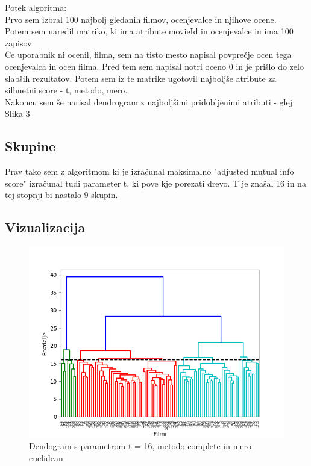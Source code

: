 \documentclass[a4paper,11pt]{article}
\begin{document}
		Potek algoritma:\\
		Prvo sem izbral 100 najbolj gledanih filmov, ocenjevalce in njihove ocene.\\
		Potem sem naredil matriko, ki ima atribute movieId in ocenjevalce in ima 100 zapisov.\\
		Če uporabnik ni ocenil, filma, sem na tisto mesto napisal povprečje ocen tega ocenjevalca in ocen filma. Pred tem sem napisal notri oceno 0 in je prišlo do zelo slabših rezultatov.
		Potem sem iz te matrike ugotovil najboljše atribute za silhuetni score - t, metodo, mero.\\
		Nakoncu sem še narisal dendrogram z najboljšimi pridobljenimi atributi - glej Slika 3
				
	\subsection{Skupine}
		Prav tako sem z algoritmom ki je izračunal maksimalno "adjusted mutual info score" izračunal tudi parameter t, ki pove kje porezati drevo.
		T je znašal 16 in na tej stopnji bi nastalo 9 skupin.
		

	\subsection{Vizualizacija}
		
	\begin{figure}[!htb]
		\begin{center}
			\includegraphics[scale=1.0]{slike/graph4_dendrogram.png}
			\caption{Dendogram s parametrom t = 16, metodo complete in mero euclidean}
			\label{slika4}
		\end{center}
	\end{figure}
\end{document}
